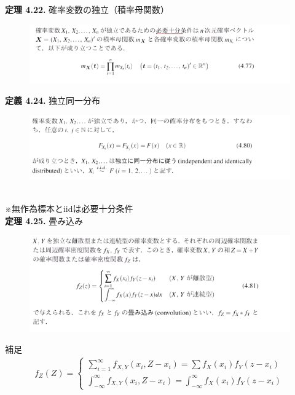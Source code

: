 \documentclass[dvipdfmx,10pt, a4j]{jarticle}
\theoremstyle{definition}
\begin{document}
\noindent
\textbf{定理 4.22.} 確率変数の独立（積率母関数）\\
\begin{figure}[htbp]
\includegraphics[width=\linewidth]{D_11/teiri/4_22.png}
\end{figure}

\noindent
\textbf{定義 4.24.} 独立同一分布\\
\begin{figure}[htbp]
\includegraphics[width=\linewidth]{D_11/teigi/4_24.png}
\end{figure}\\
※無作為標本とiidは必要十分条件\\

\newpage
\noindent
\textbf{定理 4.25.} 畳み込み\\
\begin{figure}[htbp]
\includegraphics[width=\linewidth]{D_11/teiri/4_25.png}
\end{figure}
\begin{itembox}[l]{補足}
  \begin{align*}
    f_Z(Z) =
    \begin{cases}
      \sum_{i=1}^{\infty}f_{X, Y}(x_i, Z-x_i) = \sum f_X(x_i) f_Y(z-x_i)\\
      \int_{-\infty}^{\infty}f_{X, Y}(x_i, Z-x_i) = \int_{-\infty}^{\infty}f_X(x_i) f_Y(z-x_i)
    \end{cases}
  \end{align*}
\end{itembox}\\
\end{document}

